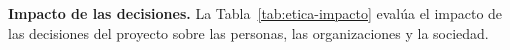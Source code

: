 
\noindent\textbf{Impacto de las decisiones.} La
Tabla~\ref{tab:etica-impacto} evalúa el impacto de las decisiones del
proyecto sobre las personas, las organizaciones y la sociedad.

